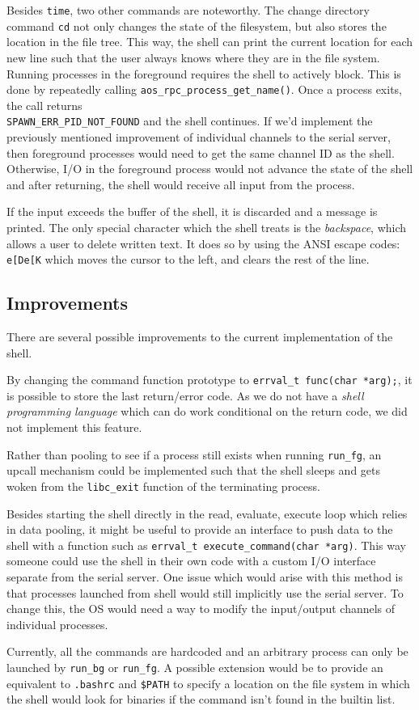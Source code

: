 Besides \verb|time|, two other commands are noteworthy. The change directory command \verb|cd| not only changes the state of the filesystem, but also stores the location in the file tree. This way, the shell can print the current location for each new line such that the user always knows where they are in the file system. Running processes in the foreground requires the shell to actively block. This is done by repeatedly calling \verb|aos_rpc_process_get_name()|. Once a process exits, the call returns \\ \verb|SPAWN_ERR_PID_NOT_FOUND| and the shell continues. If we'd implement the previously mentioned improvement of individual channels to the serial server, then foreground processes would need to get the same channel ID as the shell. Otherwise, I/O in the foreground process would not advance the state of the shell and after returning, the shell would receive all input from the process.

If the input exceeds the buffer of the shell, it is discarded and a message is printed. The only special character which the shell treats is the \emph{backspace}, which allows a user to delete written text. It does so by using the ANSI escape codes: \verb|e[De[K| which moves the cursor to the left, and clears the rest of the line.

\subsection{Improvements}
There are several possible improvements to the current implementation of the shell.

By changing the command function prototype to \verb|errval_t func(char *arg);|, it is possible to store the last return/error code. As we do not have a \emph{shell programming language} which can do work conditional on the return code, we did not implement this feature.

Rather than pooling to see if a process still exists when running \verb|run_fg|, an upcall mechanism could be implemented such that the shell sleeps and gets woken from the \verb|libc_exit| function of the terminating process.

Besides starting the shell directly in the read, evaluate, execute loop which relies in data pooling, it might be useful to provide an interface to push data to the shell with a function such as \verb|errval_t execute_command(char *arg)|. This way someone could use the shell in their own code with a custom I/O interface separate from the serial server. One issue which would arise with this method is that processes launched from shell would still implicitly use the serial server. To change this, the OS would need a way to modify the input/output channels of individual processes.

Currently, all the commands are hardcoded and an arbitrary process can only be launched by \verb|run_bg| or \verb|run_fg|. A possible extension would be to provide an equivalent to \verb|.bashrc| and \verb|$PATH| to specify a location on the file system in which the shell would look for binaries if the command isn't found in the builtin list.